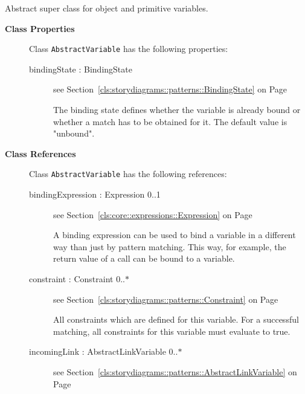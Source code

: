 	
			
Abstract super class for object and primitive variables.	
		
	


\begin{description}

	\item[\textbf{Class Properties}] Class \texttt{AbstractVariable} has the following properties:
	\begin{description}
\item[bindingState : BindingState 	]
see Section~\ref{cls:storydiagrams::patterns::BindingState} on Page~\pageref{cls:storydiagrams::patterns::BindingState}
\hspace{\fill}
\nopagebreak


	
			
The binding state defines whether the variable is already bound or whether a match has to be obtained for it. The default value is "unbound".	
		
	
	\end{description}
	
	\item[\textbf{Class References}] Class \texttt{AbstractVariable} has the following references:
	\begin{description}
\item[bindingExpression : Expression 			0..1]
see Section~\ref{cls:core::expressions::Expression} on Page~\pageref{cls:core::expressions::Expression}
\hspace{\fill}
\nopagebreak


	
			
A binding expression can be used to bind a variable in a different way than just by pattern matching. This way, for example, the return value of a call can be bound to a variable.	
		
	
\item[constraint : Constraint 			0..$*$]
see Section~\ref{cls:storydiagrams::patterns::Constraint} on Page~\pageref{cls:storydiagrams::patterns::Constraint}
\hspace{\fill}
\nopagebreak


	
			
All constraints which are defined for this variable. For a successful matching, all constraints for this variable must evaluate to true.	
		
	
\item[incomingLink : AbstractLinkVariable 			0..$*$]
see Section~\ref{cls:storydiagrams::patterns::AbstractLinkVariable} on Page~\pageref{cls:storydiagrams::patterns::AbstractLinkVariable}
\hspace{\fill}
\nopagebreak



\end{description}
\end{description}
